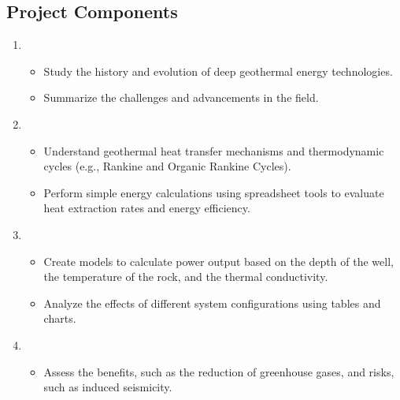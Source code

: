 \documentclass[letterpaper,10pt,english]{jupyterBook}
\begin{document}
\subsection{Project Components}
\label{\detokenize{ProjectSyllabus:id19}}\begin{enumerate}
%
\item {} 
\sphinxAtStartPar
{}
\begin{itemize}
\item {} 
\sphinxAtStartPar
Study the history and evolution of deep geothermal energy technologies.

\item {} 
\sphinxAtStartPar
Summarize the challenges and advancements in the field.

\end{itemize}

\item {} 
\sphinxAtStartPar
{}
\begin{itemize}
\item {} 
\sphinxAtStartPar
Understand geothermal heat transfer mechanisms and thermodynamic cycles (e.g., Rankine and Organic Rankine Cycles).

\item {} 
\sphinxAtStartPar
Perform simple energy calculations using spreadsheet tools to evaluate heat extraction rates and energy efficiency.

\end{itemize}

\item {} 
\sphinxAtStartPar
{}
\begin{itemize}
\item {} 
\sphinxAtStartPar
Create models to calculate power output based on the depth of the well, the temperature of the rock, and the thermal conductivity.

\item {} 
\sphinxAtStartPar
Analyze the effects of different system configurations using tables and charts.

\end{itemize}

\item {} 
\sphinxAtStartPar
{}
\begin{itemize}
\item {} 
\sphinxAtStartPar
Assess the benefits, such as the reduction of greenhouse gases, and risks, such as induced seismicity.


\end{itemize}
\end{enumerate}
\end{document}
